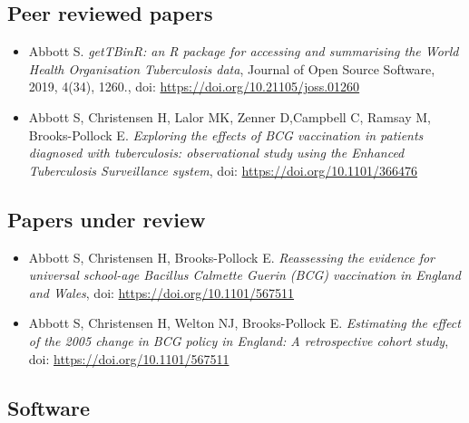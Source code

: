 \documentclass[11pt,twoside]{bristolthesis}
\begin{document}
  \hypertarget{peer-reviewed-papers}{%
  \subsection{Peer reviewed papers}\label{peer-reviewed-papers}}
  \begin{itemize}
  \item
    Abbott S. \emph{getTBinR: an R package for accessing and summarising the World Health Organisation Tuberculosis data},
    Journal of Open Source Software, 2019, 4(34), 1260., doi: \url{https://doi.org/10.21105/joss.01260}
  \item
    Abbott S, Christensen H, Lalor MK, Zenner D,Campbell C, Ramsay M, Brooks-Pollock E. \emph{Exploring the effects of BCG vaccination in patients diagnosed with tuberculosis: observational study using the Enhanced Tuberculosis Surveillance system}, doi: \url{https://doi.org/10.1101/366476}
  \end{itemize}
  \hypertarget{papers-under-review}{%
  \subsection{Papers under review}\label{papers-under-review}}
  \begin{itemize}
  \item
    Abbott S, Christensen H, Brooks-Pollock E. \emph{Reassessing the evidence for universal school-age Bacillus Calmette Guerin (BCG) vaccination in England and Wales}, doi: \url{https://doi.org/10.1101/567511}
  \item
    Abbott S, Christensen H, Welton NJ, Brooks-Pollock E. \emph{Estimating the effect of the 2005 change in BCG policy in England: A retrospective cohort study}, doi: \url{https://doi.org/10.1101/567511}
  \end{itemize}
  \hypertarget{software}{%
  \subsection{Software}\label{software}}
  
\end{document}
